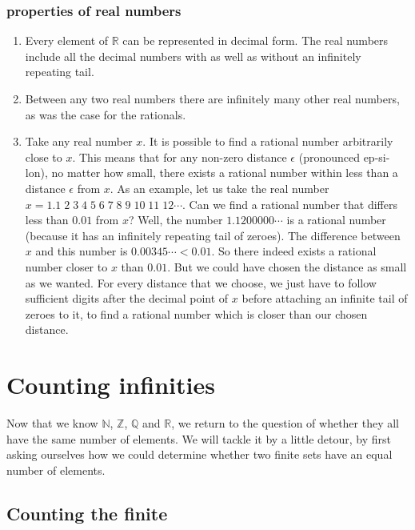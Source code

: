 \subsubsection{properties of real numbers}

\begin{enumerate}
	\item Every element of $\mathbb{R}$ can be represented in decimal form. The real numbers include all the decimal numbers with as well as without an infinitely repeating tail.
	
	\item Between any two real numbers there are infinitely many other real numbers, as was the case for the rationals.
	
	\item Take any real number $x$. It is possible to find a rational number arbitrarily close to $x$. This means that for any non-zero distance $\epsilon$ (pronounced ep-si-lon), no matter how small, there exists a rational number within less than a distance $\epsilon$ from $x$. As an example, let us take the real number $x = 1.1\;2\;3\;4\;5\;6\;7\;8\;9\;10\;11\;12\cdots$. Can we find a rational number that differs less than $0.01$ from $x$? Well, the number $1.1200000\cdots$ is a rational number (because it has an infinitely repeating tail of zeroes). The difference between $x$ and this number is $0.00345\cdots < 0.01$. So there indeed exists a rational number closer to $x$ than $0.01$. But we could have chosen the distance as small as we wanted. For every distance that we choose, we just have to follow sufficient digits after the decimal point of $x$ before attaching an infinite tail of zeroes to it, to find a rational number which is closer than our chosen distance.
\end{enumerate}

\section{Counting infinities}

\noindent Now that we know $\mathbb{N}$, $\mathbb{Z}$, $\mathbb{Q}$ and $\mathbb{R}$, we return to the question of whether they all have the same number of elements. We will tackle it by a little detour, by first asking ourselves how we could determine whether two finite sets have an equal number of elements.

\subsection{Counting the finite}
 
